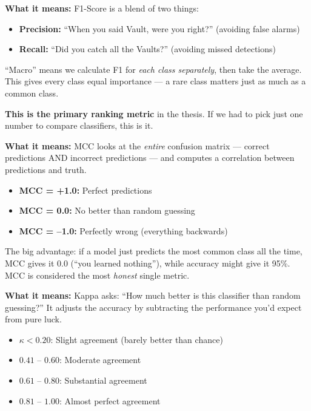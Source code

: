 \documentclass[12pt, a4paper]{article}
\begin{document}
\begin{keybox}
\textbf{What it means:} F1-Score is a blend of two things:
\begin{itemize}
    \item \textbf{Precision:} ``When you said Vault, were you right?'' (avoiding false alarms)
    \item \textbf{Recall:} ``Did you catch all the Vaults?'' (avoiding missed detections)
\end{itemize}

``Macro'' means we calculate F1 for \textit{each class separately}, then take the average. This gives every class equal importance — a rare class matters just as much as a common class.

\textbf{This is the primary ranking metric} in the thesis. If we had to pick just one number to compare classifiers, this is it.
\end{keybox}

\begin{keybox}
\textbf{What it means:} MCC looks at the \textit{entire} confusion matrix — correct predictions AND incorrect predictions — and computes a correlation between predictions and truth.
\begin{itemize}
    \item \textbf{MCC = +1.0:} Perfect predictions
    \item \textbf{MCC = 0.0:} No better than random guessing
    \item \textbf{MCC = --1.0:} Perfectly wrong (everything backwards)
\end{itemize}

The big advantage: if a model just predicts the most common class all the time, MCC gives it 0.0 (``you learned nothing''), while accuracy might give it 95\%. MCC is considered the most \textit{honest} single metric.
\end{keybox}

\begin{keybox}
\textbf{What it means:} Kappa asks: ``How much better is this classifier than random guessing?'' It adjusts the accuracy by subtracting the performance you'd expect from pure luck.
\begin{itemize}
    \item $\kappa < 0.20$: Slight agreement (barely better than chance)
    \item $0.41$ -- $0.60$: Moderate agreement
    \item $0.61$ -- $0.80$: Substantial agreement
    \item $0.81$ -- $1.00$: Almost perfect agreement
\end{itemize}
\end{keybox}
\end{document}
